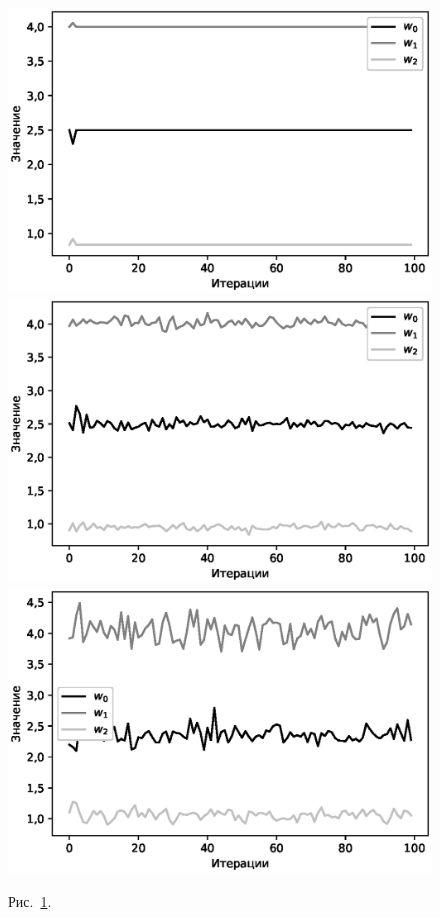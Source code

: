 \documentclass[12pt]{a&t}
\begin{document}
{\begin{figure}[h!]
\begin{center}
	\includegraphics[height = 0.2\textheight]{900noise.eps}
	\includegraphics[height = 0.2\textheight]{901noise.eps}\\
	\includegraphics[height = 0.2\textheight]{902noise.eps}
\end{center}
\caption{Рис.~\ref{ce:fig4}.}
\label{ce:fig4}
\end{figure}

}
\end{document}
